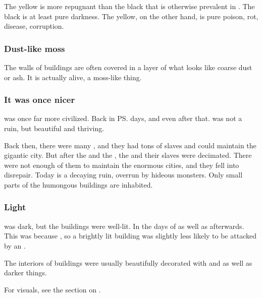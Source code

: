 The yellow is more repugnant than the black that is otherwise prevalent in \Nyx. 
The black is at least pure darkness. 
The yellow, on the other hand, is pure poison, rot, disease, corruption. 





\subsubsection{Dust-like moss}
The walls of \Nyxian{} buildings are often covered in a layer of what looks like coarse dust or ash. 
It is actually alive, a moss-like thing. 





\subsubsection{It was once nicer}
\Nyx{} was once far more civilized. 
Back in \ps{\Merkyrah}{} days, and even after that. 
\Nyx{} was not a ruin, but beautiful and thriving.

Back then, there were many \resphain, and they had tons of slaves and could maintain the gigantic city. 
But after the \secondbanewar{} and the \resphanwars, the \resphain{} and their slaves were decimated. 
There were not enough of them to maintain the enormous cities, and they fell into disrepair.
Today \Nyx{} is a decaying ruin, overrun by hideous monsters. 
Only small parts of the humongous buildings are inhabited. 





\subsubsection{Light}
\Nyx was dark, but the \resphan buildings were well-lit. 
In the days of \Merkyrah as well as afterwards. 
This was because , so a brightly lit building was slightly less likely to be attacked by an \umbra.

The interiors of buildings were usually beautifully decorated with  and  as well as darker things. 

For visuals, see the section on . 









